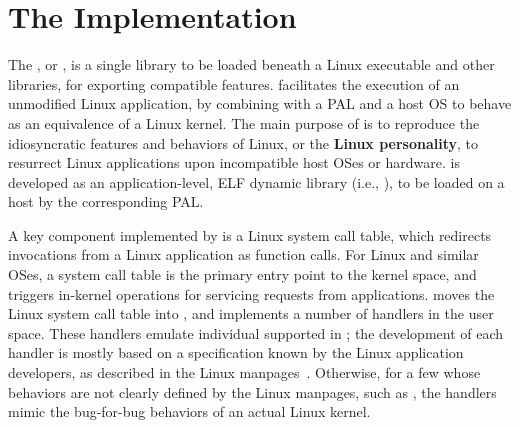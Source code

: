 \section{The \thelibos{} Implementation}


The \graphene{} \libos{}, or \thelibos{},
is a single library to be loaded beneath a Linux executable and other libraries,
for exporting compatible features.
\thelibos{} facilitates the execution of an unmodified Linux application,
by combining with a PAL and a host OS to behave as an equivalence of a Linux kernel. 
The main purpose of \thelibos{} is to reproduce
the idiosyncratic features and behaviors of Linux,
or the {\bf Linux personality},
to resurrect Linux applications upon incompatible
host OSes or hardware.
\thelibos{} is developed as an application-level, ELF dynamic library (i.e., ),
to be loaded on a host by the corresponding PAL.


A key component implemented by \thelibos{}
is a Linux system call table, which redirects \linuxapi{} invocations from a Linux application as function calls.
For Linux and similar OSes,
a system call table is the primary entry point to the kernel space,
and triggers in-kernel operations for servicing requests from applications.
\graphene{} moves the Linux system call table into \thelibos{},
and implements a number of \linuxapi{} handlers in the user space.
These \linuxapi{} handlers emulate
individual \linuxapis{} supported in \graphene{};
the development of each \linuxapi{} handler
is mostly based on a specification known by the Linux application developers,
as described in the Linux manpages~\cite{linux-man-syscall}.
Otherwise, for a few \linuxapis{} whose behaviors
are not clearly defined by the Linux manpages,
such as ,
the \linuxapi{} handlers mimic the bug-for-bug behaviors of an actual Linux kernel.







